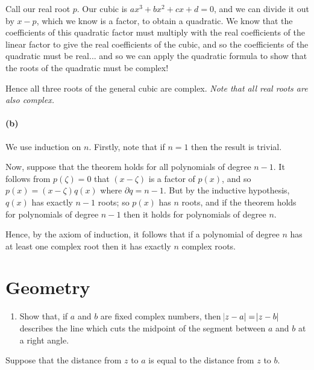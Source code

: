 \documentclass[a4paper,10pt]{article}
\newcommand{\answer}{\bfseries\color{Emerald}\refstepcounter{enumi}\item[\theenumi.]}
\begin{document}
Call our real root $ p $. Our cubic is $ a x^3 + b x^2 + cx + d = 0 $, and
we can divide it out by $ x - p $, which we know is a factor, to obtain a
quadratic. We know that the coefficients of this quadratic factor must multiply
with the real coefficients of the linear factor to give the real coefficients of
the cubic, and so the coefficients of the quadratic must be real... and so we can
apply the quadratic formula to show that the roots of the quadratic must be complex!

Hence all three roots of the general cubic are complex. \textit{Note that all real roots
are also complex.}

\paragraph{(b)}
We use induction on $ n $. Firstly, note that if $ n = 1 $ then the result is trivial.

Now, suppose that the theorem holds for all polynomials of degree $ n - 1 $. It follows from $ p(\zeta) = 0 $
that $ (x - \zeta) $ is a factor of $ p(x) $, and so $ p(x) = (x - \zeta)q(x) $ where $ \partial q = n - 1 $.
But by the inductive hypothesis, $ q(x) $ has exactly $ n - 1 $ roots; so $ p(x) $ has $ n $ roots, and if
the theorem holds for polynomials of degree $ n - 1 $ then it holds for polynomials of degree $ n $.

Hence, by the axiom of induction, it follows that if a polynomial of degree $ n $ has at least one complex
root then it has exactly $ n $ complex roots.

\section{Geometry}

\filbreak\begin{enumerate}
  \answer Show that, if $ a $ and $ b $ are fixed complex numbers, then $ \abs{z - a} = \abs{z - b} $ describes the line which
        cuts the midpoint of the segment between $ a $ and $ b $ at a right angle.
\end{enumerate}

Suppose that the distance from $ z $ to $ a $ is equal to the distance from $ z $ to $ b $.
\end{document}
